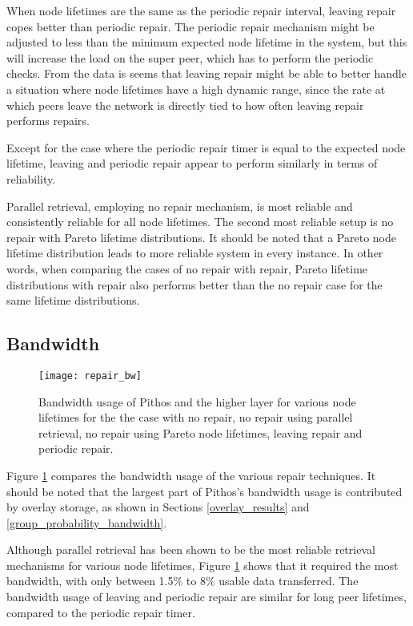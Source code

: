 When node lifetimes are the same as the periodic repair interval, leaving repair copes better than periodic repair. The periodic repair mechanism might be adjusted to less than the minimum expected node lifetime in the system, but this will increase the load on the super peer, which has to perform the periodic checks. From the data is seems that leaving repair might be able to better handle a situation where node lifetimes have a high dynamic range, since the rate at which peers leave the network is directly tied to how often leaving repair performs repairs.

Except for the case where the periodic repair timer is equal to the expected node lifetime, leaving and periodic repair appear to perform similarly in terms of reliability.

Parallel retrieval, employing no repair mechanism, is most reliable and consistently reliable for all node lifetimes. The second most reliable setup is no repair with Pareto lifetime distributions. It should be noted that a Pareto node lifetime distribution leads to more reliable system in every instance. In other words, when comparing the cases of no repair with repair, Pareto lifetime distributions with repair also performs better than the no repair case for the same lifetime distributions.

\subsection{Bandwidth}

\begin{figure}[htbp]
 \centering
 \texttt{[image: repair\_bw]}
 \caption{Bandwidth usage of Pithos and the higher layer for various node lifetimes for the the case with no repair, no repair using parallel retrieval, no repair using Pareto node lifetimes, leaving repair and periodic repair.}
 \label{fig_repair_bw_eff}
\end{figure}
%
Figure \ref{fig_repair_bw_eff} compares the bandwidth usage of the various repair techniques. It should be noted that the largest part of Pithos's bandwidth usage is contributed by overlay storage, as shown in Sections \ref{overlay_results} and \ref{group_probability_bandwidth}.

Although parallel retrieval has been shown to be the most reliable retrieval mechanisms for various node lifetimes, Figure \ref{fig_repair_bw_eff} shows that it required the most bandwidth, with only between 1.5\% to 8\% usable data transferred. The bandwidth usage of leaving and periodic repair are similar for long peer lifetimes, compared to the periodic repair timer.

